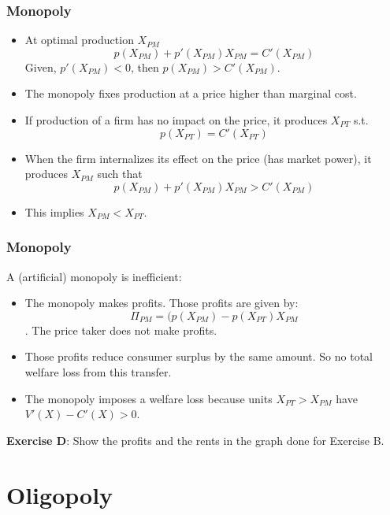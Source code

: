 \documentclass[handout]{beamer}
\begin{document}
\begin{frame}\frametitle{Monopoly}

\begin{itemize} \item At optimal production $X_{PM}$ $$p(X_{PM}) + p'(X_{PM})X_{PM} = C'(X_{PM}) $$ 
Given, $p'(X_{PM})<0$, then $ p(X_{PM}) > C'(X_{PM})$. \item The monopoly fixes production at a price higher than marginal cost. \end{itemize}

\begin{itemize}\item If production of a firm has no impact on the price, it produces $X_{PT}$ s.t. $$p(X_{PT}) = C'(X_{PT})$$ \item When the firm internalizes its effect on the price (has market power), it produces $X_{PM}$ such that  $$p(X_{PM}) + p'(X_{PM})X_{PM} > C'(X_{PM})$$ \item This implies $X_{PM} < X_{PT}$.
\end{itemize}

\end{frame}

\begin{frame}\frametitle{Monopoly}

A (artificial) monopoly is inefficient: 

\begin{itemize}
    \item The monopoly makes profits. Those profits are given by: $$ \Pi_{PM} = (p(X_{PM}) - p(X_{PT}) X_{PM} $$. The price taker does not make profits. 
    \item Those profits reduce consumer surplus by the same amount. So no total welfare loss from this transfer. 
    \item The monopoly imposes a welfare loss because units $X_{PT}>X_{PM}$ have $V'(X)-C'(X)>0$. 
\end{itemize}
\textbf{Exercise D}: Show the profits and the rents in the graph done for Exercise B. 

\end{frame}

\section{Oligopoly}
\end{document}
